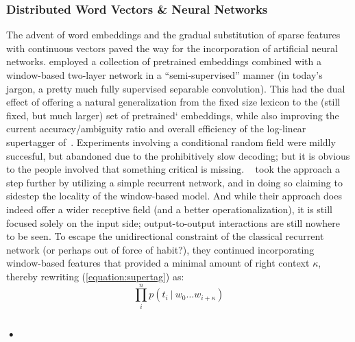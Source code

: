 \subsubsection{Distributed Word Vectors \& Neural Networks}
The advent of word embeddings and the gradual substitution of sparse features with continuous vectors paved the way for the incorporation of artificial neural networks.
\citet{10.1162/tacl_a_00186} employed a collection of pretrained embeddings combined with a window-based two-layer network in a ``semi-supervised'' manner (in today's jargon, a pretty much fully supervised separable convolution).
This had the dual effect of offering a natural generalization from the fixed size lexicon to the (still fixed, but much larger) set of pretrained` embeddings, while also improving the current accuracy/ambiguity ratio and overall efficiency of the log-linear supertagger of~\citet{clark2007wide}.
Experiments involving a conditional random field were mildly succesful, but abandoned due to the prohibitively slow decoding; but it is obvious to the people involved that something critical is missing.
~\citet{xu-etal-2015-ccg} took the approach a step further by utilizing a simple recurrent network, and in doing so claiming to sidestep the locality of the window-based model.
And while their approach does indeed offer a wider receptive field (and a better operationalization), it is still focused solely on the input side; output-to-output interactions are still nowhere to be seen.
To escape the unidirectional constraint of the classical recurrent network (or perhaps out of force of habit?), they continued incorporating window-based features that provided a minimal amount of right context $\kappa$, thereby rewriting (\ref{equation:supertag}) as:
\begin{equation}
	\prod_i^n p(t_i \ | \ w_0 \dots w_{i+\kappa})
\end{equation}

\subsubsection{•}



